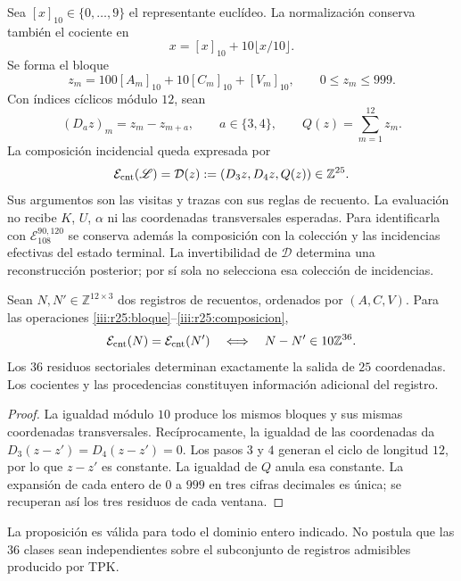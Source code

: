 Sea $[x]_{10}\in\{0,\ldots,9\}$ el representante euclídeo.
La normalización conserva también el cociente en
\[
 x=[x]_{10}+10\lfloor x/10\rfloor.
\]
Se forma el bloque
\begin{equation}
 z_m=100[A_m]_{10}+10[C_m]_{10}+[V_m]_{10},
 \qquad 0\leq z_m\leq999.
 \label{iii:r25:bloque}
\end{equation}
Con índices cíclicos módulo $12$, sean
\[
 (D_a z)_m=z_m-z_{m+a},\qquad a\in\{3,4\},
 \qquad Q(z)=\sum_{m=1}^{12}z_m.
\]
La composición incidencial queda expresada por
\begin{equation}
 \mathcal E_{\rm cnt}(\mathscr L)
 =\mathcal D(z):=(D_3z,D_4z,Q(z))\in\mathbb Z^{25}.
 \label{iii:r25:composicion}
\end{equation}
Sus argumentos son las visitas y trazas con sus reglas de recuento.
La evaluación no recibe $K$, $U$, $\alpha$ ni las coordenadas
transversales esperadas. Para identificarla con
$\mathcal E_{108}^{90,120}$ se conserva además la composición con
la colección y las incidencias efectivas del estado terminal. La
invertibilidad de $\mathcal D$ determina una reconstrucción posterior;
por sí sola no selecciona esa colección de incidencias.

\begin{proposition}
\label{iii:r25:residuos}
Sean $N,N'\in\mathbb Z^{12\times3}$ dos registros de recuentos,
ordenados por $(A,C,V)$. Para las operaciones
\eqref{iii:r25:bloque}--\eqref{iii:r25:composicion},
\[
 \mathcal E_{\rm cnt}(N)=\mathcal E_{\rm cnt}(N')
 \quad\Longleftrightarrow\quad N-N'\in10\mathbb Z^{36}.
\]
Los $36$ residuos sectoriales determinan exactamente la salida de
$25$ coordenadas. Los cocientes y las procedencias constituyen
información adicional del registro.
\end{proposition}
\begin{proof}
La igualdad módulo $10$ produce los mismos bloques y sus mismas
coordenadas transversales. Recíprocamente, la igualdad de las
coordenadas da $D_3(z-z')=D_4(z-z')=0$. Los pasos $3$ y $4$
generan el ciclo de longitud $12$, por lo que $z-z'$ es constante.
La igualdad de $Q$ anula esa constante. La expansión de cada entero
de $0$ a $999$ en tres cifras decimales es única; se recuperan así
los tres residuos de cada ventana.
\end{proof}

La proposición es válida para todo el dominio entero indicado. No
postula que las $36$ clases sean independientes sobre el subconjunto
de registros admisibles producido por TPK.


